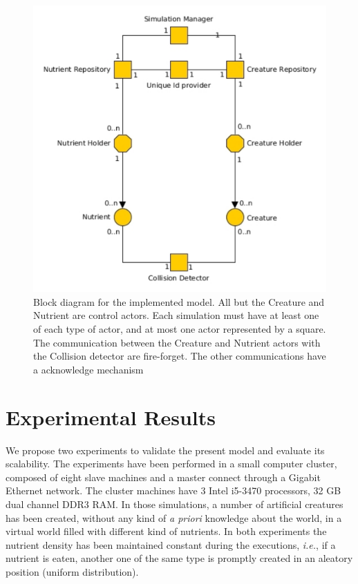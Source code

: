 \documentclass[runningheads]{llncs}
\begin{document}
\begin{figure}
	\centering
	\includegraphics[width=14cm]{images/diagramaAtores}
	\caption{Block diagram for the implemented model. All but the Creature and Nutrient are control actors. Each simulation must have at least one of each type of actor, and at most one actor represented by a square. The communication between the Creature and Nutrient actors with the Collision detector are fire-forget. The other communications have a acknowledge mechanism}
	\label{diagramaAtores}
\end{figure}

\section{Experimental Results}
\label{sec:results}

We propose two experiments to validate the present model and evaluate its scalability. The experiments have been performed in a small computer cluster, composed of eight slave machines and a master connect through a Gigabit Ethernet network. The cluster machines have 3 Intel i5-3470 processors, 32 GB dual channel DDR3 RAM. In those simulations, a number of artificial creatures has been created, without any kind of \textit{a priori} knowledge about the world, in a virtual world filled with different kind of nutrients. In both experiments the nutrient density has been maintained constant during the executions, \textit{i.e.},  if a nutrient is eaten, another one of the same type is promptly created in an aleatory position (uniform distribution). 
\end{document}
